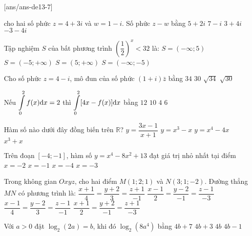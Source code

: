 
\begin{name}
	{\tenchude}
	{\tendethi}
	{\tentruong}
	{\thoigian}
\end{name}
[ans/ans-de13-7]

\begin{ex}%
cho hai số phức $z=4+3 i$ và $w=1-i$. Số phức $z-w$ bằng
\choice
{$5+2 i$}
{$7-i$}
{\True $3+4 i$}
{$-3-4 i$}

\end{ex}
\begin{ex}%
Tập nghiệm $S$ của bất phương trình $\left(\dfrac{1}{2}\right)^{x}<32$ là:
\choice
{$S=(-\infty; 5)$}
{\True $S=(-5;+\infty)$}
{$S=(5;+\infty)$}
{$S=(-\infty;-5)$}

\end{ex}
\begin{ex}%
Cho số phức $z=4-i$, mô đun của số phức $(1+i) \bar{z}$ bằng
\choice
{$34$}
{$30$}
{\True $\sqrt{34}$}
{$\sqrt{30}$}

\end{ex}
\begin{ex}%
Nếu $\displaystyle\displaystyle\int\limits_0^2 f(x) \mathrm{d} x=2$ thì $\displaystyle\displaystyle\int\limits_0^2[4 x-f(x)] \mathrm{d} x$ bằng
\choice
{$12$}
{$10$}
{$4$}
{\True $6$}

\end{ex}
\begin{ex}%
Hàm số nào dưới đây đồng biến trên $\mathbb{R}$?
\choice
{$y=\dfrac{3 x-1}{x+1}$}
{$y=x^3-x$}
{$y=x^4-4 x$}
{\True $x^3+x$}

\end{ex}
\begin{ex}%
Trên đoạn $[-4;-1]$, hàm số $y=x^4-8 x^2+13$ đạt giá trị nhỏ nhất tại điểm
\choice
{\True $x=-2$}
{$x=-1$}
{$x=-4$}
{$x=-3$}

\end{ex}
\begin{ex}%
Trong không gian $O x y z$, cho hai điểm $M(1; 2; 1)$ và $N(3; 1;-2)$. Đường thẳng $MN$ có phương trình là:
\choice
{$\dfrac{x+1}{4}=\dfrac{y+2}{3}=\dfrac{z+1}{-1}$}
{\True $\dfrac{x-1}{2}=\dfrac{y-2}{-1}=\dfrac{z-1}{-3}$}
{$\dfrac{x-1}{4}=\dfrac{y-2}{3}=\dfrac{z-1}{-1}$}
{$\dfrac{x+1}{2}=\dfrac{y+2}{-1}=\dfrac{z+1}{-3}$}

\end{ex}
\begin{ex}%
Với $a>0$ đặt $\log_2(2 a)=b$, khi đó $\log_2\left(8 a^4\right)$ bằng
\choice
{$4 b+7$}
{$4 b+3$}
{$4 b$}
{\True $4 b-1$}

\end{ex}
